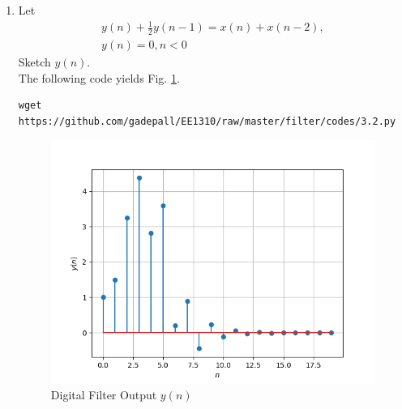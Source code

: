\documentclass[journal,12pt,twocolumn]{IEEEtran}
\theoremstyle{remark}
\renewcommand\thesection{\arabic{section}}
\numberwithin{equation}{subsection}
\begin{document}
\begin{enumerate}[label=\thesection.\arabic*,ref=\thesection.\theenumi]
\item Let
\begin{multline}
\label{eq:iir_filter}
y(n) + \frac{1}{2}y(n-1) = x(n) + x(n-2), 
\\
 y(n) = 0, n < 0
\end{multline}
Sketch $y(n)$.
\\
\solution The following code yields Fig. \ref{fig:y_n}.
\begin{lstlisting}
wget https://github.com/gadepall/EE1310/raw/master/filter/codes/3.2.py
\end{lstlisting}
\begin{figure}[!h]
\begin{center}
\includegraphics[width=\columnwidth]{figs/3.2.png}
\end{center}
\caption{Digital Filter Output $y(n)$}
\label{fig:y_n}	
\end{figure}

\end{enumerate}
\end{document}
